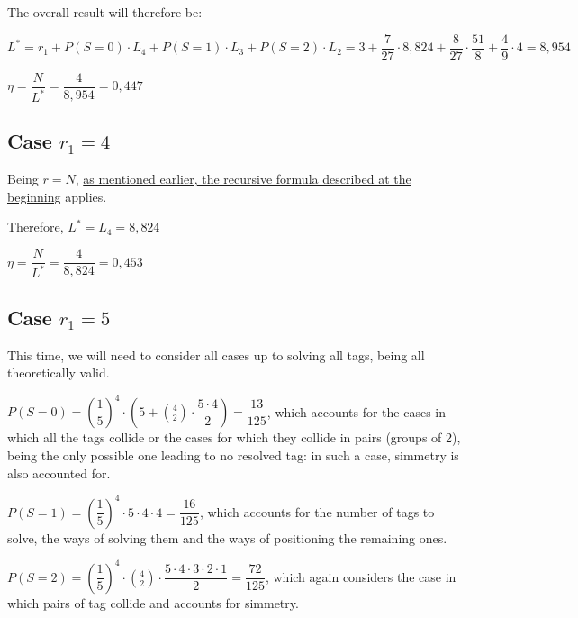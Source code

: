 \documentclass[a4paper,11pt]{article} %
\begin{document}
\bigskip

The overall result will therefore be:

\medskip

$L^{*} = r_1 + P(S = 0) \cdot L_4 + P(S = 1) \cdot L_3 + P(S = 2) \cdot L_2 = 3 + \dfrac{7}{27} \cdot 8,824 + \dfrac{8}{27} \cdot \dfrac{51}{8} + \dfrac{4}{9} \cdot 4 = 8,954$

\medskip

$\eta = \dfrac{N}{L^{*}} = \dfrac{4}{8,954} = 0,447$

\subsection{Case $r_1 = 4$}

Being $r = N$, \hyperref[computation-L4]{as mentioned earlier, the recursive formula described at the beginning} applies.

\smallskip

Therefore, $L^{*} = L_4 = 8,824$

\medskip

$\eta = \dfrac{N}{L^{*}} = \dfrac{4}{8,824} = 0,453$

\subsection{Case $r_1 = 5$}

This time, we will need to consider all cases up to solving all tags, being all theoretically valid.

\medskip

$P(S = 0) = \left(\dfrac{1}{5}\right)^4 \cdot \left(5 + \displaystyle\binom{4}{2} \cdot \dfrac{5 \cdot 4}{2}\right) = \dfrac{13}{125}$, which accounts for the cases in which all the tags collide or the cases for which they collide in pairs (groups of 2), being the only possible one leading to no resolved tag: in such a case, simmetry is also accounted for.

\medskip

$P(S = 1) = \left(\dfrac{1}{5}\right)^4 \cdot 5 \cdot 4 \cdot 4 = \dfrac{16}{125}$, which accounts for the number of tags to solve, the ways of solving them and the ways of positioning the remaining ones.

\medskip

$P(S = 2) = \left(\dfrac{1}{5}\right)^4 \cdot \displaystyle\binom{4}{2} \cdot \dfrac{5 \cdot 4 \cdot 3 \cdot 2 \cdot 1}{2} = \dfrac{72}{125}$, which again considers the case in which pairs of tag collide and accounts for simmetry.
\end{document}
